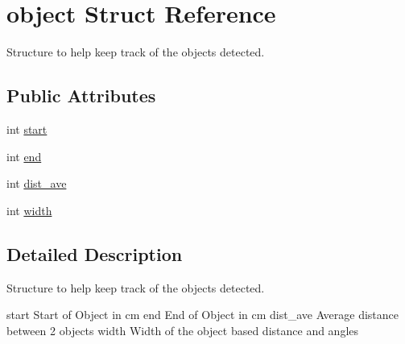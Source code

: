 \hypertarget{structobject}{
\section{object Struct Reference}
\label{structobject}
}


Structure to help keep track of the objects detected.  


\subsection*{Public Attributes}
\begin{DoxyCompactItemize}
\item 
int \hyperlink{structobject_a8c7c0bcdde914c29f95fbf1606495dc6}{start}
\item 
int \hyperlink{structobject_a717decadf98785544486cb36e1c4e5c4}{end}
\item 
int \hyperlink{structobject_a359d1105e92c540fb16c03ff59a5d9e0}{dist\_\-ave}
\item 
int \hyperlink{structobject_a609f10330b355e8dc16f62af1378df40}{width}
\end{DoxyCompactItemize}


\subsection{Detailed Description}
Structure to help keep track of the objects detected. 

start Start of Object in cm end End of Object in cm dist\_\-ave Average distance between 2 objects width Width of the object based distance and angles 

